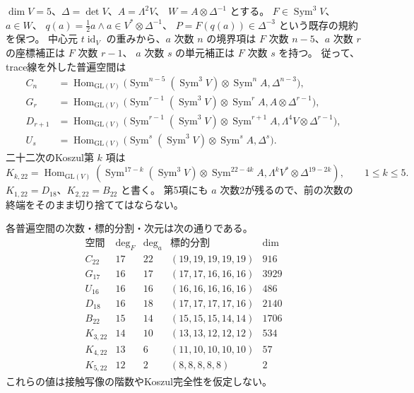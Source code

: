 $\dim V=5$、$\Delta=\det V$、$A=\Lambda^2V$、
$W=A\otimes\Delta^{-1}$ とする。
$F\in\operatorname{Sym}^3V$、$a\in W$、
$q(a)=\tfrac12a\wedge a\in V^*\otimes\Delta^{-1}$、
$P=F(q(a))\in\Delta^{-3}$ という既存の規約を保つ。
中心元 $t\operatorname{id}_V$ の重みから、$a$ 次数 $n$ の境界項は
$F$ 次数 $n-5$、$a$ 次数 $r$ の座標補正は $F$ 次数 $r-1$、
$a$ 次数 $s$ の単元補正は $F$ 次数 $s$ を持つ。
従って、trace線を外した普遍空間は
\begin{align*}
 C_n&=\operatorname{Hom}_{\mathrm{GL}(V)}
 \bigl(\operatorname{Sym}^{n-5}(\operatorname{Sym}^3V)
       \otimes\operatorname{Sym}^{n}A,\Delta^{n-3}\bigr),\\
 G_r&=\operatorname{Hom}_{\mathrm{GL}(V)}
 \bigl(\operatorname{Sym}^{r-1}(\operatorname{Sym}^3V)
       \otimes\operatorname{Sym}^{r}A,A\otimes\Delta^{r-1}\bigr),\\
 D_{r+1}&=\operatorname{Hom}_{\mathrm{GL}(V)}
 \bigl(\operatorname{Sym}^{r-1}(\operatorname{Sym}^3V)
       \otimes\operatorname{Sym}^{r+1}A,\Lambda^4V\otimes\Delta^{r-1}\bigr),\\
 U_s&=\operatorname{Hom}_{\mathrm{GL}(V)}
 \bigl(\operatorname{Sym}^{s}(\operatorname{Sym}^3V)
       \otimes\operatorname{Sym}^{s}A,\Delta^s\bigr).
\end{align*}
二十二次のKoszul第 $k$ 項は
\[
 K_{k,22}=\operatorname{Hom}_{\mathrm{GL}(V)}
 \left(\operatorname{Sym}^{17-k}(\operatorname{Sym}^3V)
 \otimes\operatorname{Sym}^{22-4k}A,
 \Lambda^kV^*\otimes\Delta^{19-2k}\right),\qquad 1\leq k\leq5.
\]
$K_{1,22}=D_{18}$、$K_{2,22}=B_{22}$ と書く。
第5項にも $a$ 次数2が残るので、前の次数の終端をそのまま切り捨ててはならない。

\begin{proposition}[二十二次の厳密次元]
\label{prop:v16-character-dimensions}
各普遍空間の次数・標的分割・次元は次の通りである。
\[
\begin{array}{c|r|r|c|r}
\text{空間}&\deg_F&\deg_a&\text{標的分割}&\dim\\\hline
C_{22}&17&22&(19,19,19,19,19)&916\\
G_{17}&16&17&(17,17,16,16,16)&3929\\
U_{16}&16&16&(16,16,16,16,16)&486\\
D_{18}&16&18&(17,17,17,17,16)&2140\\
B_{22}&15&14&(15,15,15,14,14)&1706\\
K_{3,22}&14&10&(13,13,12,12,12)&534\\
K_{4,22}&13&6&(11,10,10,10,10)&57\\
K_{5,22}&12&2&(8,8,8,8,8)&2
\end{array}
\]
これらの値は接触写像の階数やKoszul完全性を仮定しない。
\end{proposition}

